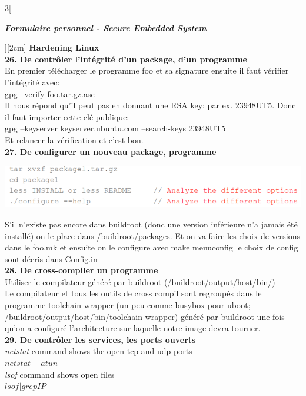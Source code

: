 \begin{multicols}{3}[\centerline{ \large\em \textbf{Formulaire personnel - Secure Embedded System}}][2cm]
{\Large \textbf{Hardening Linux}}
\\ \textbf{26. De contrôler l’intégrité d’un package, d’un programme\\}
En premier télécharger le programme foo et sa signature ensuite il faut vérifier l'intégrité avec:\\
gpg --verify foo.tar.gz.asc\\
Il nous répond qu'il peut pas en donnant une RSA key: par ex. 23948UT5. Donc il faut importer cette clé publique:\\
gpg --keyserver keyserver.ubuntu.com --search-keys 23948UT5\\
Et relancer la vérification et c'est bon.
\\ \textbf{27. De configurer un nouveau package, programme\\}
\begin{minipage}{\linewidth}
	\centering
    \includegraphics[width =0.8\columnwidth]{images/17.png}
\end{minipage}
S'il n'existe pas encore dans buildroot (donc une version inférieure n'a jamais été installé) on le place dans /buildroot/packages.
Et on va faire les choix de versions dans le foo.mk et ensuite on le configure avec make menuconfig le choix de config sont décris dans Config.in
\\ \textbf{28. De cross-compiler un programme\\}
Utiliser le compilateur généré par buildroot (/buildroot/output/host/bin/)\\
Le compilateur et tous les outils de cross compil sont regroupés dans le programme toolchain-wrapper (un peu comme busybox pour uboot; /buildroot/output/host/bin/toolchain-wrapper) généré par buildroot une fois qu'on a configuré l'architecture sur laquelle notre image devra tourner.\\
\textbf{29. De contrôler les services, les ports ouverts\\}
\textit{netstat} command shows the open tcp and udp ports\\
$netstat -atun$\\
\textit{lsof} command shows open files\\
$ lsof | grep IP$\\

\end{multicols}
